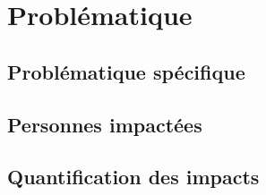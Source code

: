 \section{Problématique}

\subsection{Problématique spécifique}

\subsection{Personnes impactées}

\subsection{Quantification des impacts}
